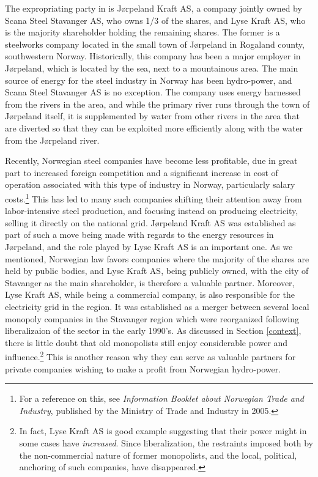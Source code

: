 The expropriating party in \cite{måland13} is Jørpeland Kraft AS, a company jointly owned by Scana Steel Stavanger AS, who owns 1/3 of the shares, and Lyse Kraft AS, who is the majority shareholder holding the remaining shares. The former is a steelworks company located in the small town of Jørpeland in Rogaland county, southwestern Norway. Historically, this company has been a major employer in Jørpeland, which is located by the sea, next to a mountainous area. The main source of energy for the steel industry in Norway has been hydro-power, and Scana Steel Stavanger AS is no exception. The company uses energy harnessed from the rivers in the area, and while the primary river runs through the town of Jørpeland itself, it is supplemented by water from other rivers in the area that are diverted so that they can be exploited more efficiently along with the water from the Jørpeland river.

Recently, Norwegian steel companies have become less profitable, due in great part to increased foreign competition and a significant increase in cost of operation associated with this type of industry in Norway, particularly salary costs.\footnote{For a reference on this, see \emph{Information Booklet about Norwegian Trade and Industry}, published by the Ministry of Trade and Industry in 2005.} This has led to many such companies shifting their attention away from labor-intensive steel production, and focusing instead on producing electricity, selling it directly on the national grid. Jørpeland Kraft AS was established as part of such a move being made with regards to the energy resources in Jørpeland, and the role played by Lyse Kraft AS is an important one. As we mentioned, Norwegian law favors companies where the majority of the shares are held by public bodies, and Lyse Kraft AS, being publicly owned, with the city of Stavanger as the main shareholder, is therefore a valuable partner. Moreover, Lyse Kraft AS, while being a commercial company, is also responsible for the electricity grid in the region. It was established as a merger between several local monopoly companies in the Stavanger region which were reorganized following liberalizaion of the sector in the early 1990's. As discussed in Section \ref{context}, there is little doubt that old monopolists still enjoy considerable power and influence.\footnote{In fact, Lyse Kraft AS is good example suggesting that their power might in some cases have \emph{increased}. Since liberalization, the restraints imposed both by the non-commercial nature of former monopolists, and the local, political, anchoring of such companies, have disappeared.} This is another reason why they can serve as valuable partners for private companies wishing to make a profit from Norwegian hydro-power.

